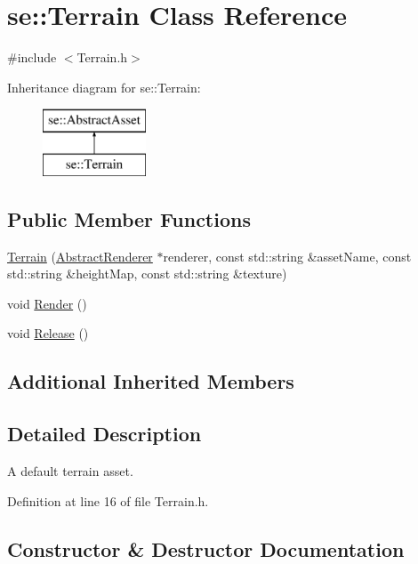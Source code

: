 \hypertarget{classse_1_1_terrain}{}\section{se\+:\+:Terrain Class Reference}
\label{classse_1_1_terrain}


{\ttfamily \#include $<$Terrain.\+h$>$}

Inheritance diagram for se\+:\+:Terrain\+:\begin{figure}[H]
\begin{center}
\leavevmode
\includegraphics[height=2.000000cm]{classse_1_1_terrain}
\end{center}
\end{figure}
\subsection*{Public Member Functions}
\begin{DoxyCompactItemize}
\item 
\mbox{\hyperlink{classse_1_1_terrain_a0e20b4b0333c3d92bfe143bf3cc17b2a}{Terrain}} (\mbox{\hyperlink{classse_1_1_abstract_renderer}{Abstract\+Renderer}} $\ast$renderer, const std\+::string \&asset\+Name, const std\+::string \&height\+Map, const std\+::string \&texture)
\item 
void \mbox{\hyperlink{classse_1_1_terrain_a0fcef77b6b1d8e32ce49a396d4d733e2}{Render}} ()
\item 
void \mbox{\hyperlink{classse_1_1_terrain_aab4ebd41c3ae26b258928d8f2454ed88}{Release}} ()
\end{DoxyCompactItemize}
\subsection*{Additional Inherited Members}


\subsection{Detailed Description}
A default terrain asset. 

Definition at line 16 of file Terrain.\+h.



\subsection{Constructor \& Destructor Documentation}
\mbox{\label{classse_1_1_terrain_a0e20b4b0333c3d92bfe143bf3cc17b2a}} 
